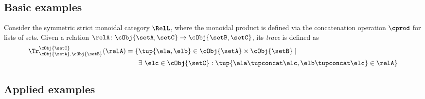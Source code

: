 \subsection{Basic examples}
\begin{ctdefinition}
    \label{def:tuple-REL-trace}
    Consider the symmetric strict monoidal category $\RelL$, where the monoidal product is defined via the concatenation operation $\cprod$ for lists of sets.
    Given a relation $\relA \colon \cObj{\setA, \setC}  \to \cObj{\setB, \setC}$, its \emph{trace} is defined as
    \begin{equation}
        \label{eq:tupel-REL-tracedef}
        \begin{aligned}
            \Tr_{\cObj{\setA}, \cObj{\setB}}^{\cObj{\setC}}(\relA) = \{ & \tup{\ela, \elb} \in \cObj{\setA} \times \cObj{\setB} \mid \\
                                                                           & \exists \ \elc \in \cObj{\setC} : \tup{\ela \tupconcat \elc, \elb \tupconcat \elc} \in \relA \}
        \end{aligned}
    \end{equation}
\end{ctdefinition}


\subsection{Applied examples}



